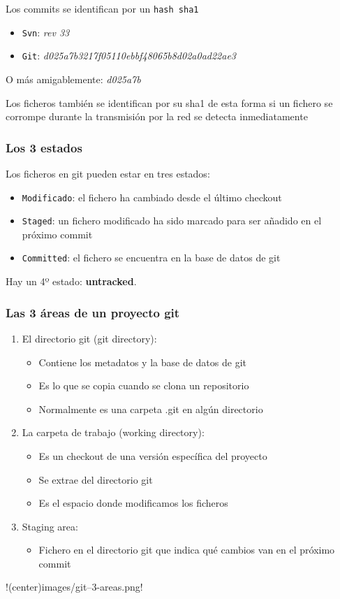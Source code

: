 Los commits se identifican por un \texttt{hash sha1}

\begin{itemize}
\item
  \texttt{Svn}: \emph{rev 33}
\item
  \texttt{Git}: \emph{d025a7b3217f05110ebbf48065b8d02a0ad22ae3}
\end{itemize}
O más amigablemente: \emph{d025a7b}

Los ficheros también se identifican por su sha1 de esta forma si un
fichero se corrompe durante la transmisión por la red se detecta
inmediatamente

\subsubsection{Los 3 estados}

Los ficheros en git pueden estar en tres estados:

\begin{itemize}
\item
  \texttt{Modificado}: el fichero ha cambiado desde el último checkout
\item
  \texttt{Staged}: un fichero modificado ha sido marcado para ser
  añadido en el próximo commit
\item
  \texttt{Committed}: el fichero se encuentra en la base de datos de git
\end{itemize}
Hay un 4º estado: \textbf{untracked}.

\subsubsection{Las 3 áreas de un proyecto git}

\begin{enumerate}
\item
  El directorio git (git directory):
  \begin{itemize}
  \item
    Contiene los metadatos y la base de datos de git
  \item
    Es lo que se copia cuando se clona un repositorio
  \item
    Normalmente es una carpeta .git en algún directorio
  \end{itemize}
\item
  La carpeta de trabajo (working directory):
  \begin{itemize}
  \item
    Es un checkout de una versión específica del proyecto
  \item
    Se extrae del directorio git
  \item
    Es el espacio donde modificamos los ficheros
  \end{itemize}
\item
  Staging area:
  \begin{itemize}
  \item
    Fichero en el directorio git que indica qué cambios van en el
    próximo commit
  \end{itemize}
\end{enumerate}
!(center)images/git--3-areas.png!

